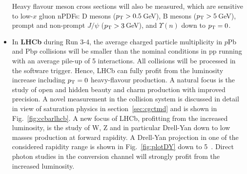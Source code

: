 \documentclass[../report.tex]{subfiles}
\begin{document}
\begin{itemize}
Heavy flavour meson cross sections will also be measured, which are sensitive to low-$x$ gluon nPDFs: D mesons ($p\sb{\scriptstyle\mathrm{T}}>0.5$\,GeV), B mesons ($p\sb{\scriptstyle\mathrm{T}}>5$\,GeV), prompt and non-prompt $J/\psi$ ($p\sb{\scriptstyle\mathrm{T}}>3$\,GeV), and $\Upsilon(n)$ down to $p\sb{\scriptstyle\mathrm{T}}=0$. 
\item In \textbf{LHCb} during Run 3-4, the average charged particle multiplicity in $p$Pb and Pb$p$ collisions will be smaller than the nominal conditions in pp running with an average  pile-up of 5 interactions. All \pPb collisions will be processed in the software trigger. Hence, LHCb can fully profit from the luminosity increase including $p\sb{\scriptstyle\mathrm{T}}=0$ heavy-flavour production.  A natural focus is the study of open and hidden beauty and charm production with improved precision. A novel measurement in the \pPb collision system is discussed in detail in view of saturation physics in section~\ref{sec:cgctmd} and is shown in Fig.~\ref{fig:ccbarlhcb}.  A new focus of LHCb, profitting from the increased luminosity, is the study of W, Z and in particular Drell-Yan down to low masses production at forward rapidity. A Drell-Yan projection in one of the considered rapidity range is shown in Fig.~\ref{fig:plotDY} down to 5~\UGeVcc. Direct photon studies in the conversion channel will strongly profit from the increased luminosity. 
\end{itemize}
\end{document}
